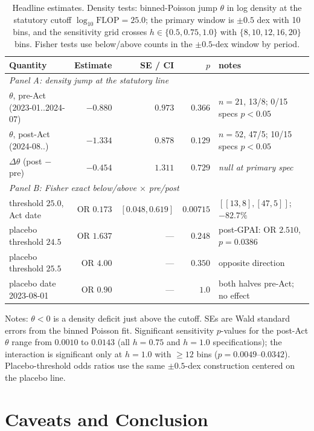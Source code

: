 \documentclass[11pt]{article}
\begin{document}
\begin{table}[t]
\centering
\small
\caption{Headline estimates. Density tests: binned-Poisson jump $\theta$ in
log density at the statutory cutoff $\log_{10}\mathrm{FLOP}=25.0$; the
primary window is $\pm 0.5$ dex with 10 bins, and the sensitivity grid
crosses $h\in\{0.5,0.75,1.0\}$ with $\{8,10,12,16,20\}$ bins. Fisher tests
use below/above counts in the $\pm 0.5$-dex window by period.}
\label{tab:main}
\begin{tabular}{lrrrl}
\toprule
Quantity & Estimate & SE / CI & $p$ & notes \\
\midrule
\multicolumn{5}{l}{\emph{Panel A: density jump at the statutory line}}\\
$\theta$, pre-Act (2023-01..2024-07)  & $-0.880$ & $0.973$ & $0.366$ & $n=21$, 13/8; 0/15 specs $p<0.05$ \\
$\theta$, post-Act (2024-08..)        & $-1.334$ & $0.878$ & $0.129$ & $n=52$, 47/5; 10/15 specs $p<0.05$ \\
$\Delta\theta$ (post $-$ pre)         & $-0.454$ & $1.311$ & $0.729$ & \emph{null at primary spec} \\
\midrule
\multicolumn{5}{l}{\emph{Panel B: Fisher exact below/above $\times$ pre/post}}\\
threshold $25.0$, Act date       & OR $0.173$ & $[0.048, 0.619]$ & $0.00715$ & $[[13,8],[47,5]]$; $-82.7\%$ \\
placebo threshold $24.5$         & OR $1.637$ & ---     & $0.248$  & post-GPAI: OR $2.510$, $p=0.0386$ \\
placebo threshold $25.5$         & OR $4.00$  & ---     & $0.350$  & opposite direction \\
placebo date 2023-08-01          & OR $0.90$  & ---     & $1.0$    & both halves pre-Act; no effect \\
\bottomrule
\end{tabular}

\medskip
\parbox{0.92\textwidth}{\footnotesize Notes: $\theta<0$ is a density deficit
just above the cutoff. SEs are Wald standard errors from the binned Poisson
fit. Significant sensitivity $p$-values for the post-Act $\theta$ range from
$0.0010$ to $0.0143$ (all $h=0.75$ and $h=1.0$ specifications); the
interaction is significant only at $h=1.0$ with $\geq 12$ bins
($p=0.0049$--$0.0342$). Placebo-threshold odds ratios use the same
$\pm 0.5$-dex construction centered on the placebo line.}
\end{table}

\section{Caveats and Conclusion}\label{sec:conclusion}
\end{document}
